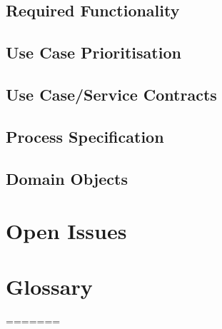 \documentclass[a4paper]{article}
\begin{document}
\subsection{Required Functionality}

\subsection{Use Case Prioritisation}

\subsection{Use Case/Service Contracts}

\subsection{Process Specification}

\subsection{Domain Objects}

\section{Open Issues}

\section{Glossary}
=======
\usepackage{graphicx}
\end{document}
